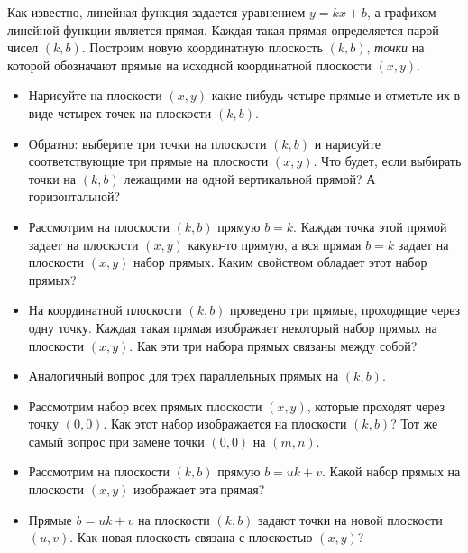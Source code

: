 ﻿

Как известно, линейная функция задается уравнением $y = kx + b$, а графиком линейной функции является прямая. Каждая такая прямая определяется парой чисел $(k,b)$. Построим новую координатную плоскость $(k,b)$, {\itshape точки} на которой обозначают прямые на исходной координатной плоскости $(x,y)$. 

\begin{itemize}
\item Нарисуйте на плоскости $(x,y)$ какие-нибудь четыре прямые и отметьте их в виде четырех точек на плоскости $(k,b)$. 
\item Обратно: выберите три точки на плоскости $(k,b)$ и нарисуйте соответствующие три прямые на плоскости $(x,y)$. Что будет, если выбирать точки на $(k,b)$ лежащими на одной вертикальной прямой? А горизонтальной?
\item Рассмотрим на плоскости $(k,b)$ прямую $b=k$. Каждая точка этой прямой задает на плоскости $(x,y)$ какую-то прямую, а вся прямая $b=k$ задает на плоскости $(x,y)$ набор прямых. Каким свойством обладает этот набор прямых?
\item На координатной плоскости $(k,b)$ проведено три прямые, проходящие через одну точку. Каждая такая прямая изображает некоторый набор прямых на плоскости $(x,y)$. Как эти три набора прямых связаны между собой?
\item Аналогичный вопрос для трех параллельных прямых на $(k,b)$.
\item Рассмотрим набор всех прямых плоскости $(x,y)$, которые проходят через точку $(0,0)$. Как этот набор изображается на плоскости $(k,b)$? Тот же самый вопрос при замене точки $(0,0)$ на $(m,n)$.
\item Рассмотрим на плоскости $(k,b)$ прямую $b = uk + v$. Какой набор прямых на плоскости $(x,y)$ изображает эта прямая? 
\item Прямые $b = uk + v$ на плоскости $(k,b)$ задают точки на новой плоскости $(u,v)$. Как новая плоскость связана с плоскостью $(x,y)$?
\end{itemize}